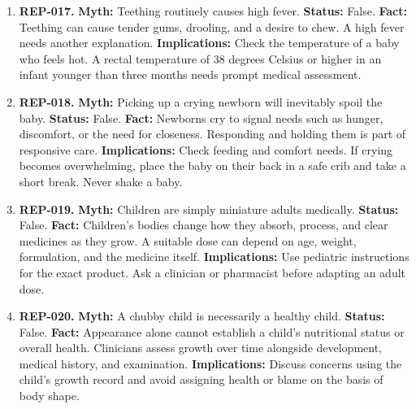 \documentclass[11pt,oneside]{book}
\begin{document}
\begin{enumerate}[leftmargin=0pt,labelwidth=0pt,labelsep=0pt,itemindent=0pt]
\textbf{Implications:} Mix formula exactly as directed. If an infant is feeding poorly or seems dehydrated, seek medical advice before offering extra water.
\item[] \textbf{REP-017.} \textbf{Myth:} Teething routinely causes high fever.\newline
\textbf{Status:} False.\newline
\textbf{Fact:} Teething can cause tender gums, drooling, and a desire to chew. A high fever needs another explanation. \cite{ref331,ref295}\newline
\textbf{Implications:} Check the temperature of a baby who feels hot. A rectal temperature of 38 degrees Celsius or higher in an infant younger than three months needs prompt medical assessment.
\item[] \textbf{REP-018.} \textbf{Myth:} Picking up a crying newborn will inevitably spoil the baby.\newline
\textbf{Status:} False.\newline
\textbf{Fact:} Newborns cry to signal needs such as hunger, discomfort, or the need for closeness. Responding and holding them is part of responsive care. \cite{ref70}\newline
\textbf{Implications:} Check feeding and comfort needs. If crying becomes overwhelming, place the baby on their back in a safe crib and take a short break. Never shake a baby.
\item[] \textbf{REP-019.} \textbf{Myth:} Children are simply miniature adults medically.\newline
\textbf{Status:} False.\newline
\textbf{Fact:} Children's bodies change how they absorb, process, and clear medicines as they grow. A suitable dose can depend on age, weight, formulation, and the medicine itself. \cite{ref257}\newline
\textbf{Implications:} Use pediatric instructions for the exact product. Ask a clinician or pharmacist before adapting an adult dose.
\item[] \textbf{REP-020.} \textbf{Myth:} A chubby child is necessarily a healthy child.\newline
\textbf{Status:} False.\newline
\textbf{Fact:} Appearance alone cannot establish a child's nutritional status or overall health. Clinicians assess growth over time alongside development, medical history, and examination. \cite{ref258}\newline
\textbf{Implications:} Discuss concerns using the child's growth record and avoid assigning health or blame on the basis of body shape.

\end{enumerate}
\end{document}
